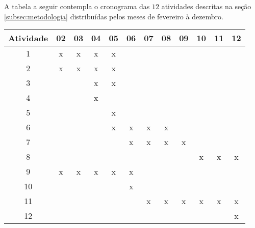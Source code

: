 A tabela a seguir contempla o cronograma das $12$ atividades descritas na seção \ref{subsec:metodologia} distribuídas pelos meses de fevereiro à dezembro.

\begin{table}[!ht]
	\centering
    \label{tab:cronograma}
	\begin{tabular}{c | c c c c c c c c c c c }
		Atividade & 02 & 03 & 04 & 05 & 06 & 07 & 08 & 09 & 10 & 11 & 12  \\
		\hline
	    1 & x & x & x & x & & & & & & & \\
	    2 & x & x & x & x & & & & & & & \\
	    3 & & & x & x & & & & & & & \\
	    4 & & & x & & & & & & & & \\
	    5 & & & & x & & & & & & & \\
	    6 & & & & x & x & x & x & & & & \\
	    7 & & & & & x & x & x & x & & & \\
	    8 & & & & & & & & & x & x & x \\
	    9 & x & x & x & x & x & & & & & & \\
	    10 & & & & & x & & & & & & \\
	    11 & & & & & & x & x & x & x & x & x\\
	    12 & & & & & & & & & & & x\\
	\end{tabular}
\end{table}

